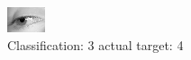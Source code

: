 \begin{figure}[h!]
\begin{center}
\includegraphics[width=0.60\columnwidth]{figures/ID3060_class_3_target_4.png}
\end{center}
\caption{ Classification: 3 actual target: 4}
\label{fig:ID3060_class_3_target_4}
\end{figure}
